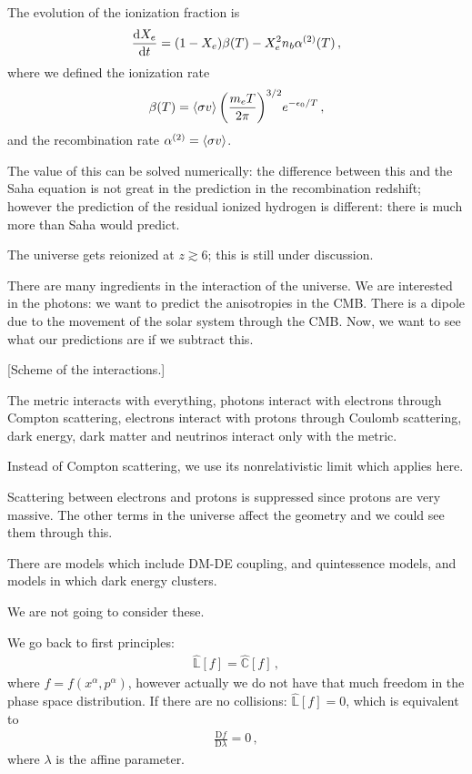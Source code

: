 \documentclass[main.tex]{subfiles}
\begin{document}
The evolution of the ionization fraction is 
%
\begin{align}
\dv{X_{e}}{t} = (1-X_{e}) \beta (T) - X^2_{e} n_b \alpha^{(2)} (T)
\,,
\end{align}
%
where we defined the ionization rate 
%
\begin{align}
\beta (T) = \expval{\sigma v} \qty(\frac{m_e T}{2 \pi })^{3/2} e^{- \epsilon_0 /T}
\,,
\end{align}
%
and the recombination rate \(\alpha^{(2)} = \expval{\sigma v}\). 

The value of this can be solved numerically: the difference between this and the Saha equation is not great in the prediction in the recombination redshift; however the prediction of the residual ionized hydrogen is different: there is much more than Saha would predict. 

The universe gets reionized at \(z \gtrsim 6\); this is still under discussion. 

There are many ingredients in the interaction of the universe. We are interested in the photons: we want to predict the anisotropies in the CMB. 
There is a dipole due to the movement of the solar system through the CMB. Now, we want to see what our predictions are if we subtract this. 

[Scheme of the interactions.]

The metric interacts with everything, photons interact with electrons through Compton scattering, electrons interact with protons through Coulomb scattering, dark energy, dark matter and neutrinos  interact only with the metric.

Instead of Compton scattering, we use its nonrelativistic limit which applies here. 

Scattering between electrons and protons is suppressed since protons are very massive. The other terms in the universe affect the geometry and we could see them through this. 

There are models which include DM-DE coupling, and quintessence models, 
and models in which dark energy clusters. 

We are not going to consider these. 

We go back to first principles: 
%
\begin{align}
\hat{\mathbb{L}} [f] = \hat{\mathbb{C}} [f]
\,,
\end{align}
%
where \(f = f(x^{\alpha }, p^{\alpha })\), however actually we do not have that much freedom in the phase space distribution. 
If there are no collisions: \(\hat{\mathbb{L}} [f] =0 \), which is equivalent to 
%
\begin{align}
\frac{\mathrm{D}f}{\mathrm{D}\lambda } =0
\,,
\end{align}
%
where \(\lambda \) is the affine parameter. 
\end{document}
